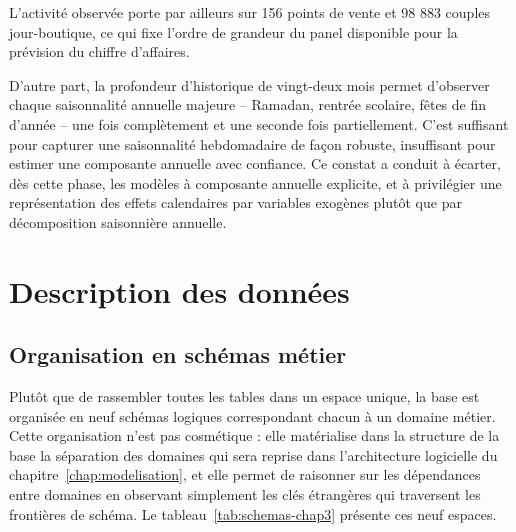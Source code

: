 L'activité observée porte par ailleurs sur 156 points de vente et 98 883 couples jour-boutique, ce qui fixe l'ordre de grandeur du panel disponible pour la prévision du chiffre d'affaires.

D'autre part, la profondeur d'historique de vingt-deux mois permet d'observer chaque saisonnalité annuelle majeure -- Ramadan, rentrée scolaire, fêtes de fin d'année -- une fois complètement et une seconde fois partiellement. C'est suffisant pour capturer une saisonnalité hebdomadaire de façon robuste, insuffisant pour estimer une composante annuelle avec confiance. Ce constat a conduit à écarter, dès cette phase, les modèles à composante annuelle explicite, et à privilégier une représentation des effets calendaires par variables exogènes plutôt que par décomposition saisonnière annuelle.

\section{Description des données}
\label{sec:description}

\subsection{Organisation en schémas métier}

Plutôt que de rassembler toutes les tables dans un espace unique, la base est organisée en neuf schémas logiques correspondant chacun à un domaine métier. Cette organisation n'est pas cosmétique : elle matérialise dans la structure de la base la séparation des domaines qui sera reprise dans l'architecture logicielle du chapitre~\ref{chap:modelisation}, et elle permet de raisonner sur les dépendances entre domaines en observant simplement les clés étrangères qui traversent les frontières de schéma. Le tableau~\ref{tab:schemas-chap3} présente ces neuf espaces.

\begingroup
\setlength{\tabcolsep}{3pt}
\renewcommand{\arraystretch}{1.15}
\small

